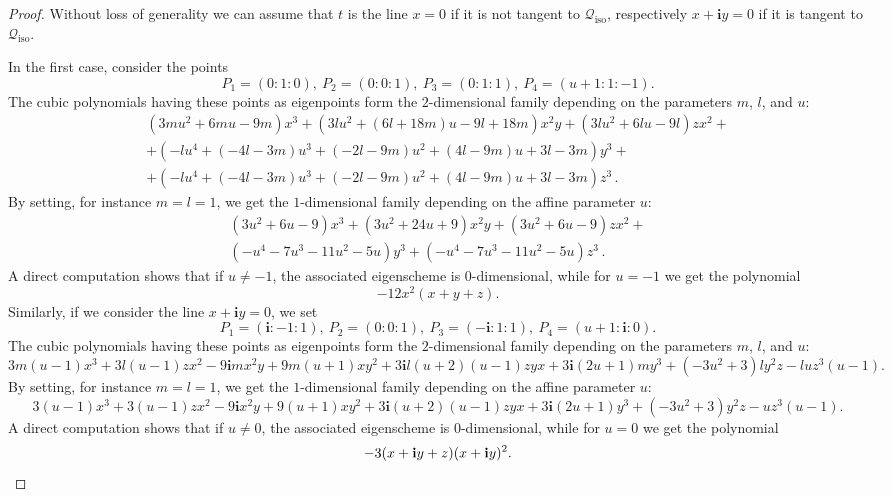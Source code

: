 \documentclass{amsart}
\theoremstyle{plain}
\theoremstyle{definition}
\newcommand{\iso}{\mathcal{Q}_{\mathrm{iso}}}
\newcommand{\iii}{\textbf{i}}
\begin{document}
\begin{proof}
Without loss of generality we can assume that $t$ is the line $x=0$ if it is not tangent to $\iso$, respectively $x+\iii y=0$ if it is tangent to $\iso$.

In the first case, consider the points
\[
  P_1=(0:1:0), \ P_2=(0:0:1), \ P_3=(0:1:1), \ P_4=(u+1:1:-1).
\]
The cubic polynomials having these points as eigenpoints form the $2$-dimensional family depending on the parameters $m$, $l$, and $u$:
%
\begin{multline*}
  (3mu^2 + 6mu - 9m) x^3 + (3 l u^2+(6l + 18m)u - 9l + 18m) x^2 y + (3lu^2 + 6lu - 9l) z x^2 + \\
  +(-l u^4+(-4 l-3 m) u^3+(-2 l-9 m) u^2+(4 l-9 m) u + 3 l-3 m) y^3+ \\
  +(-l u^4 + (-4 l-3 m)u^3 + (-2l - 9m) u^2 + (4l - 9m)u + 3l - 3m) z^3 \,.
\end{multline*}
%
By setting, for instance $m=l=1$, we get the $1$-dimensional family depending on the affine parameter $u$:
%
\begin{multline*}
  (3 u^2+6 u-9) x^3+(3 u^2+24 u+9) x^2 y+(3 u^2+6 u-9) z x^2+\\
  (-u^4-7 u^3-11 u^2-5 u) y^3+(-u^4-7 u^3-11 u^2-5 u) z^3 \,.
\end{multline*}
%
A direct computation shows that if $u \neq -1$, the associated eigenscheme is $0$-dimensional, while for $u=-1$ we get the polynomial
%
\[
  -12 x^2 (x+ y+ z).
\]
%
Similarly, if we consider the line $x+\iii y=0$, we set
%
\[
  P_1=(\iii:-1:1), \ P_2=(0:0:1), \ P_3=(-\iii:1:1), \ P_4=(u+1: \iii:0).
\]
%
The cubic polynomials having these points as eigenpoints form the $2$-dimensional family depending on the parameters $m$, $l$, and $u$:
%
$$
  3m(u-1)x^3+3l(u-1)zx^2-9\iii mx^2y+9m(u+1) xy^2+3 \iii l(u+2)(u-1)zyx+3\iii (2u+1)my^3+(-3u^2+3)ly^2 z-l u z^3 (u-1).
$$
%
By setting, for instance $m=l=1$, we get the $1$-dimensional family depending on the affine parameter $u$:
%
$$
  3(u-1)x^3+3(u-1)zx^2-9\iii x^2y+9(u+1) xy^2+3 \iii (u+2)(u-1)zyx+3\iii (2u+1)y^3+(-3u^2+3)y^2 z- u z^3 (u-1).
$$
%
A direct computation shows that if $u \neq 0$, the associated eigenscheme is $0$-dimensional, while for $u=0$ we get the polynomial
%
\[
  -3(x+\iii y+z)(x+\iii y)^2. \qedhere
\]
%
\end{proof}
\end{document}
